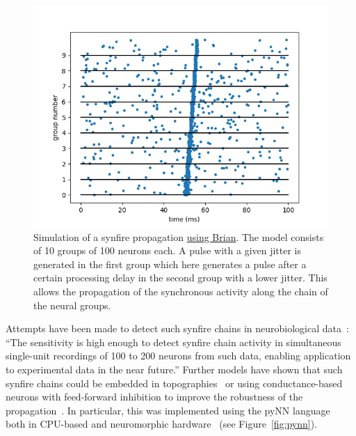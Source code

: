 \documentclass[brainsci, %
               review,submit,pdftex,moreauthors]{Definitions/mdpi}
\begin{document}
\begin{figure}
\centering
\includegraphics{figures/Diesmann_et_al_1999.png}
\caption{Simulation of a synfire propagation \href{https://brian2.readthedocs.io/en/stable/examples/frompapers.Diesmann_et_al_1999.html}{using Brian}. The model consists of 10 groups of 100 neurons each. A pulse with a given jitter is generated in the first group which here generates a pulse after a certain processing delay in the second group with a lower jitter. This allows the propagation of the synchronous activity along the chain of the neural groups.}\label{fig:diesman}
\end{figure}
Attempts have been made to detect such synfire chains in neurobiological data~\citep{schrader_detecting_2008}: ``The sensitivity is high enough to detect synfire chain activity in simultaneous single-unit recordings of 100 to 200 neurons from such data, enabling application to experimental data in the near future.'' Further models have shown that such synfire chains could be embedded in topographies~\citep{aviel_embedding_2003} or using conductance-based neurons with feed-forward inhibition to improve the robustness of the propagation~\citep{kremkow_functional_2010}. In particular, this was implemented using the pyNN language~\citep{davison_pynn_2008} both in CPU-based and neuromorphic hardware~\citep{pfeil_six_2013} (see Figure~\ref{fig:pynn}).
\end{document}

